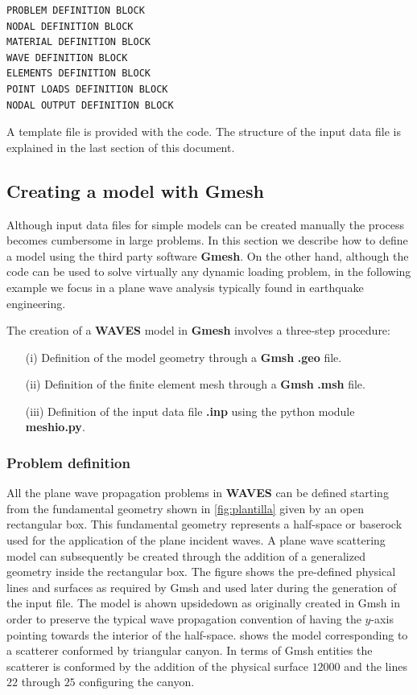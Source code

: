 \documentclass[12pt,letterpaper]{article}
\begin{document}
\begin{verbatim}
PROBLEM DEFINITION BLOCK
NODAL DEFINITION BLOCK
MATERIAL DEFINITION BLOCK
WAVE DEFINITION BLOCK
ELEMENTS DEFINITION BLOCK
POINT LOADS DEFINITION BLOCK
NODAL OUTPUT DEFINITION BLOCK
\end{verbatim}

A template file is provided with the code. The structure of the input data file is explained in the last section of this document.
\subsection*{Creating a model with Gmesh}
Although input data files for simple models can be created manually the process becomes cumbersome in large problems. In this section we describe how to define a model using the third party software {\bf Gmesh}. On the other hand, although the code can be used to solve virtually any dynamic loading problem, in the following example we focus in a plane wave analysis typically found in earthquake engineering. 

The creation of a {\bf WAVES} model in {\bf Gmesh} involves a three-step procedure:

\begin{itemize}
\item[(i)  ]  Definition of the model geometry through a {\bf Gmsh} {\bf *.geo} file.
\item[(ii) ]  Definition of the finite element mesh through a {\bf Gmsh}  {\bf *.msh} file.
\item[(iii)]  Definition of the input data file {\bf *.inp} using the python module {\bf meshio.py}.
\end{itemize}

\subsubsection*{Problem definition}
All the plane wave propagation problems in {\bf WAVES} can be defined starting from the fundamental geometry shown in \cref{fig:plantilla} given by an open rectangular box. This fundamental geometry represents a half-space or baserock used for the application of the plane incident waves. A plane wave scattering model can subsequently be created through the addition of a generalized geometry inside the rectangular box. The figure shows the pre-defined physical lines and surfaces as required by Gmsh and used later during the generation of the input file. The model is ahown upsidedown as originally created in Gmsh in order to preserve the typical wave propagation convention of having the $y$-axis pointing towards the interior of the half-space.  shows the model corresponding to a scatterer conformed by triangular canyon. In terms of Gmsh entities the scatterer is conformed by the addition of the physical surface $12000$ and the lines $22$ through $25$ configuring the canyon.
  
\end{document}
